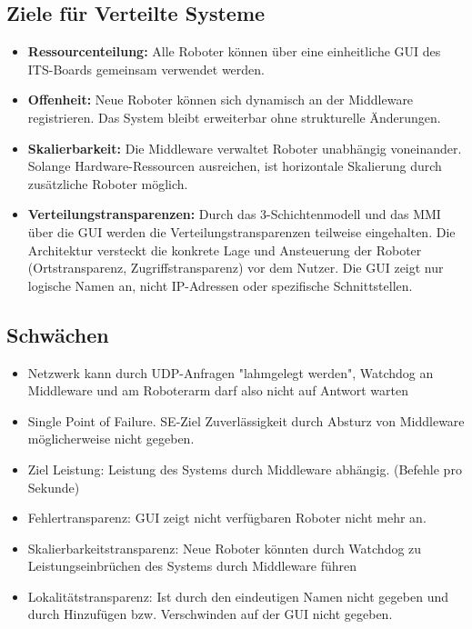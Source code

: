 \subsection*{Ziele für Verteilte Systeme}
\begin{itemize}
	\item \textbf{Ressourcenteilung:} Alle Roboter können über eine einheitliche GUI des ITS-Boards gemeinsam verwendet werden.
	\item \textbf{Offenheit:} Neue Roboter können sich dynamisch an der Middleware registrieren. Das System bleibt erweiterbar ohne strukturelle Änderungen.
	\item \textbf{Skalierbarkeit:} Die Middleware verwaltet Roboter unabhängig voneinander. Solange Hardware-Ressourcen ausreichen, ist horizontale Skalierung durch zusätzliche Roboter möglich.
	\item \textbf{Verteilungstransparenzen:} Durch das 3-Schichtenmodell und das MMI über die GUI werden die Verteilungstransparenzen teilweise eingehalten. Die Architektur versteckt die konkrete Lage und Ansteuerung der Roboter (Ortstransparenz, Zugriffstransparenz) vor dem Nutzer. Die GUI zeigt nur logische Namen an, nicht IP-Adressen oder spezifische Schnittstellen.
\end{itemize}


\subsection*{Schwächen}
\begin{itemize}
	\item Netzwerk kann durch UDP-Anfragen "lahmgelegt werden", Watchdog an Middleware und am Roboterarm darf also nicht auf Antwort warten
	\item Single Point of Failure. SE-Ziel Zuverlässigkeit durch Absturz von Middleware möglicherweise nicht gegeben.
	\item Ziel Leistung: Leistung des Systems durch Middleware abhängig. (Befehle pro Sekunde)
	\item Fehlertransparenz: GUI zeigt nicht verfügbaren Roboter nicht mehr an.
	\item Skalierbarkeitstransparenz: Neue Roboter könnten durch Watchdog zu Leistungseinbrüchen des Systems durch Middleware führen
	\item Lokalitätstransparenz: Ist durch den eindeutigen Namen nicht gegeben und durch Hinzufügen bzw. Verschwinden auf der GUI nicht gegeben.
\end{itemize}



